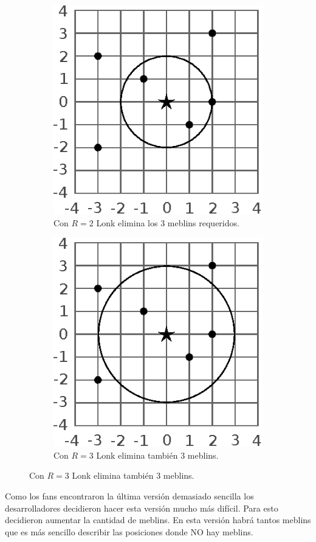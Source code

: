 \documentclass{oci}
\begin{document}
\begin{problemDescription}
  \begin{figure}[h]
    \centering
    \begin{subfigure}{0.3\textwidth}
      \centering
      \includegraphics[scale=0.8]{zolda2}
      \caption*{Con $R=2$ Lonk elimina los 3 meblins requeridos.}
    \end{subfigure}
    \hspace{3em}
    \begin{subfigure}{0.3\textwidth}
      \centering
      \includegraphics[scale=0.8]{zolda3}
      \caption*{Con $R=3$ Lonk elimina también 3 meblins.}
    \end{subfigure}
  \end{figure}

  Como los fans encontraron la última versión demasiado sencilla los
  desarrolladores decidieron hacer esta versión mucho más difícil.
  Para esto decidieron aumentar la cantidad de meblins.
  En esta versión habrá tantos meblins que es más sencillo describir las
  posiciones donde NO hay meblins.
\end{problemDescription}
\end{document}
